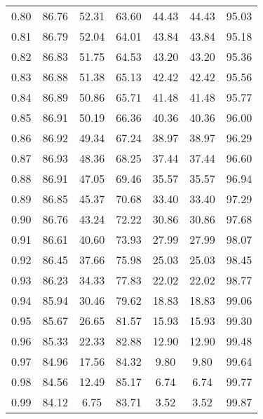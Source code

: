 \begin{tabular}{|c|c|c|c|c|c|c|}
      0.80 &     86.76 &     52.31 &      63.60 &   44.43 &      44.43 &         95.03 \\
      0.81 &     86.79 &     52.04 &      64.01 &   43.84 &      43.84 &         95.18 \\
      0.82 &     86.83 &     51.75 &      64.53 &   43.20 &      43.20 &         95.36 \\
      0.83 &     86.88 &     51.38 &      65.13 &   42.42 &      42.42 &         95.56 \\
      0.84 &     86.89 &     50.86 &      65.71 &   41.48 &      41.48 &         95.77 \\
      0.85 &     86.91 &     50.19 &      66.36 &   40.36 &      40.36 &         96.00 \\
      0.86 &     86.92 &     49.34 &      67.24 &   38.97 &      38.97 &         96.29 \\
      0.87 &     86.93 &     48.36 &      68.25 &   37.44 &      37.44 &         96.60 \\
      0.88 &     86.91 &     47.05 &      69.46 &   35.57 &      35.57 &         96.94 \\
      0.89 &     86.85 &     45.37 &      70.68 &   33.40 &      33.40 &         97.29 \\
      0.90 &     86.76 &     43.24 &      72.22 &   30.86 &      30.86 &         97.68 \\
      0.91 &     86.61 &     40.60 &      73.93 &   27.99 &      27.99 &         98.07 \\
      0.92 &     86.45 &     37.66 &      75.98 &   25.03 &      25.03 &         98.45 \\
      0.93 &     86.23 &     34.33 &      77.83 &   22.02 &      22.02 &         98.77 \\
      0.94 &     85.94 &     30.46 &      79.62 &   18.83 &      18.83 &         99.06 \\
      0.95 &     85.67 &     26.65 &      81.57 &   15.93 &      15.93 &         99.30 \\
      0.96 &     85.33 &     22.33 &      82.88 &   12.90 &      12.90 &         99.48 \\
      0.97 &     84.96 &     17.56 &      84.32 &    9.80 &       9.80 &         99.64 \\
      0.98 &     84.56 &     12.49 &      85.17 &    6.74 &       6.74 &         99.77 \\
      0.99 &     84.12 &      6.75 &      83.71 &    3.52 &       3.52 &         99.87 \\
\bottomrule
\end{tabular}
